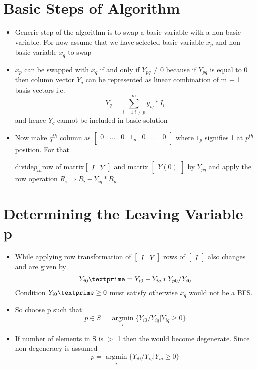 \documentclass[twoside]{article}
\begin{document}
\section{Basic Steps of Algorithm}
\begin{itemize}
\item Generic step of the algorithm is to swap a basic variable with a non basic variable. For now assume
that we have selected basic variable $x_p$ and non-basic variable $x_q$ to swap
\item $x_p$ can be swapped with $x_q$ if and only if $Y_{pq} \ne 0$ because if $Y_{pq}$ is equal to 0 then column vector $Y_q$
can be represented as linear combination of m − 1 basis vectors i.e.
\[ Y_q=\sum_{i=1~i \neq p}^m y_{iq} \ast I_i\]
and hence $Y_q$ cannot be included in basic solution
\item Now make $q^{th}$ column as $ \left[ \begin{array}{ccccccc}
 0 & ... & 0 & 1_p & 0 & ... & 0
  \end{array} \right]$ where $1_p$
  signifies 1 at
  $p^{th}$
  position. For that

 divide$p_{th}$row of matrix$ \left[ \begin{array}{cc}
I &
Y  \end{array} \right]$
and matrix $ \left[ \begin{array}{cc}
Y(0) \end{array} \right]$
by
$Y_{pq}$ and apply the row operation $R_i \Rightarrow R_i - Y_{iq} \ast R_p$
\end{itemize}
\section{Determining the Leaving Variable p}
\begin{itemize}
\item While applying row transformation of
$ \left[ \begin{array}{cc}
I &
Y  \end{array} \right]$ rows of $ \left[ \begin{array}{c}
I  \end{array} \right]$ also changes and are given by
\[Y_{i0}\textprime =Y_{i0}-Y_{iq}\ast Y_{p0} / Y_{i0} \]
Condition $Y_{i0}\textprime \ge 0 $ must satisfy otherwise $x_q$ would not be a BFS.
\item So choose p such that
\[p \in S = \underset{i}{\operatorname{argmin}} \{Y_{i0}/Y_{iq} | Y_{iq} \ge 0\}\]
\item If number of elements in S is $>$ 1 then the would become degenerate. Since non-degeneracy is assumed
\[p = \underset{i}{\operatorname{argmin}}\{Y_{i0}/Y_{iq} | Y_{iq} \ge 0\}\]
\end{itemize}
\end{document}
